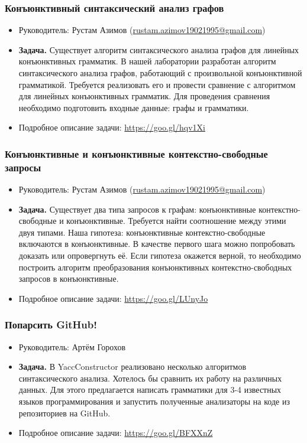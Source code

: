 \documentclass{beamer}
\begin{document}
\begin{frame}
  \transwipe[direction=90]
  \frametitle{Конъюнктивный синтаксический анализ графов}
  \begin{itemize}
    \item Руководитель: Рустам Азимов (\url{rustam.azimov19021995@gmail.com})
    \item \textbf{Задача.} 
    Существует алгоритм синтаксического анализа графов для линейных конъюнктивных грамматик. 
    В нашей лаборатории разработан алгоритм синтаксического анализа графов, работающий с произвольной конъюнктивной грамматикой.
    Требуется реализовать его и провести сравнение с алгоритмом для линейных конъюнктивных грамматик. 
    Для проведения сравнения необходимо подготовить входные данные: графы и грамматики.
    \item Подробное описание задачи: \url{https://goo.gl/hqv1Xi}
  \end{itemize}
\end{frame}

\begin{frame}
  \transwipe[direction=90]
  \frametitle{Конъюнктивные и конъюнктивные контекстно-свободные запросы}
  \begin{itemize}
    \item Руководитель: Рустам Азимов (\url{rustam.azimov19021995@gmail.com})
    \item \textbf{Задача.} 
    Существует два типа запросов к графам: конъюнктивные контекстно-свободные и конъюнктивные. 
    Требуется найти соотношение между этими двуя типами.
    Наша гипотеза: конъюнктивные контекстно-свободные включаются в конъюнктивные.
    В качестве первого шага можно попробовать доказать или опровергнуть её. 
    Если гипотеза окажется верной, то необходимо построить алгоритм преобразования конъюнктивных контекстно-свободных запросов в конъюнктивные.
    \item Подробное описание задачи: \url{https://goo.gl/LUnyJo}
  \end{itemize}
\end{frame}


\begin{frame}
  \transwipe[direction=90]
  \frametitle{Попарсить GitHub!}
  \begin{itemize}
    \item Руководитель: Артём Горохов
    \item \textbf{Задача.}
    В YaccConstructor реализовано несколько алгоритмов синтаксического анализа.
    Хотелось бы сравнить их работу на различных данных.
    Для этого предлагается написать грамматики для 3-4 известных языков программирования и запустить полученные анализаторы на коде из репозиториев на GitHub.
    \item Подробное описание задачи: \url{https://goo.gl/BFXXnZ}
  \end{itemize}

\end{frame}
\end{document}
